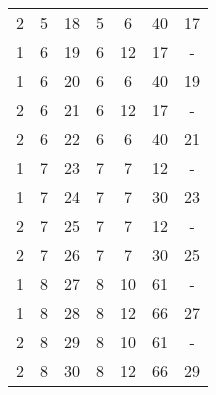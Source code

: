 \begin{table}[htbp]
\begin{tabular}{ccccccc}
    2     & 5     & 18    & 5     & 6     & 40    & 17 \\
    1     & 6     & 19    & 6     & 12    & 17    & - \\
    1     & 6     & 20    & 6     & 6     & 40    & 19 \\
    2     & 6     & 21    & 6     & 12    & 17    & - \\
    2     & 6     & 22    & 6     & 6     & 40    & 21 \\
    1     & 7     & 23    & 7     & 7     & 12    & - \\
    1     & 7     & 24    & 7     & 7     & 30    & 23 \\
    2     & 7     & 25    & 7     & 7     & 12    & - \\
    2     & 7     & 26    & 7     & 7     & 30    & 25 \\
    1     & 8     & 27    & 8     & 10    & 61    & - \\
    1     & 8     & 28    & 8     & 12    & 66    & 27 \\
    2     & 8     & 29    & 8     & 10    & 61    & - \\
    2     & 8     & 30    & 8     & 12    & 66    & 29 \\
    \bottomrule
    \end{tabular}%
  \label{tab:addlabel}%
\end{table}%
